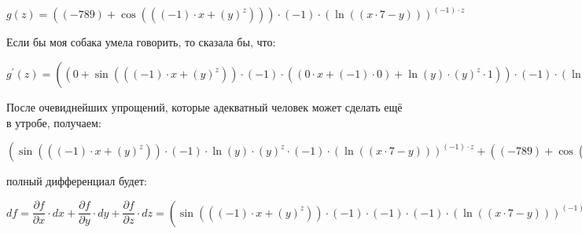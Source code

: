 \documentclass[a4paper,12pt]{article}
\begin{document}
\begin{flushleft}
$g(z) = ((-789)+\cos {(((-1) \cdot x+(y)^{z}))}) \cdot (-1) \cdot (\ln {((x \cdot 7-y))})^{(-1) \cdot z}$

Если бы моя собака умела говорить, то сказала бы, что:

$g^{'}(z) = ((0+\sin {(((-1) \cdot x+(y)^{z}))} \cdot (-1) \cdot ((0 \cdot x+(-1) \cdot 0)+\ln {(y)} \cdot (y)^{z} \cdot 1)) \cdot (-1) \cdot (\ln {((x \cdot 7-y))})^{(-1) \cdot z}+((-789)+\cos {(((-1) \cdot x+(y)^{z}))}) \cdot (0 \cdot (\ln {((x \cdot 7-y))})^{(-1) \cdot z}+(-1) \cdot (\ln {((x \cdot 7-y))})^{(-1) \cdot z} \cdot ((0 \cdot z+(-1) \cdot 1) \cdot \ln {(\ln {((x \cdot 7-y))})}+(-1) \cdot z \cdot  \dfrac{1}{\ln {((x \cdot 7-y))}}  \cdot  \dfrac{1}{(x \cdot 7-y)}  \cdot ((0 \cdot 7+x \cdot 0)-0))))$

После очевиднейших упрощений, которые адекватный человек может сделать ещё в утробе, получаем:

$(\sin {(((-1) \cdot x+(y)^{z}))} \cdot (-1) \cdot \ln {(y)} \cdot (y)^{z} \cdot (-1) \cdot (\ln {((x \cdot 7-y))})^{(-1) \cdot z}+((-789)+\cos {(((-1) \cdot x+(y)^{z}))}) \cdot (-1) \cdot (\ln {((x \cdot 7-y))})^{(-1) \cdot z} \cdot (-1) \cdot \ln {(\ln {((x \cdot 7-y))})})$

 полный дифференциал будет:

$df = \dfrac{\partial f}{\partial x} \cdot dx + \dfrac{\partial f}{\partial y} \cdot dy + \dfrac{\partial f}{\partial z} \cdot dz = (\sin {(((-1) \cdot x+(y)^{z}))} \cdot (-1) \cdot (-1) \cdot (-1) \cdot (\ln {((x \cdot 7-y))})^{(-1) \cdot z}+((-789)+\cos {(((-1) \cdot x+(y)^{z}))}) \cdot (-1) \cdot (\ln {((x \cdot 7-y))})^{(-1) \cdot z} \cdot (-1) \cdot z \cdot  \dfrac{1}{\ln {((x \cdot 7-y))}}  \cdot  \dfrac{1}{(x \cdot 7-y)}  \cdot 7) \cdot dx + (\sin {(((-1) \cdot x+(y)^{z}))} \cdot (-1) \cdot z \cdot (y)^{(z-1)} \cdot (-1) \cdot (\ln {((x \cdot 7-y))})^{(-1) \cdot z}+((-789)+\cos {(((-1) \cdot x+(y)^{z}))}) \cdot (-1) \cdot (\ln {((x \cdot 7-y))})^{(-1) \cdot z} \cdot (-1) \cdot z \cdot  \dfrac{1}{\ln {((x \cdot 7-y))}}  \cdot  \dfrac{1}{(x \cdot 7-y)}  \cdot (-1)) \cdot dy + (\sin {(((-1) \cdot x+(y)^{z}))} \cdot (-1) \cdot \ln {(y)} \cdot (y)^{z} \cdot (-1) \cdot (\ln {((x \cdot 7-y))})^{(-1) \cdot z}+((-789)+\cos {(((-1) \cdot x+(y)^{z}))}) \cdot (-1) \cdot (\ln {((x \cdot 7-y))})^{(-1) \cdot z} \cdot (-1) \cdot \ln {(\ln {((x \cdot 7-y))})}) \cdot dz$

\end{flushleft}
\end{document}
